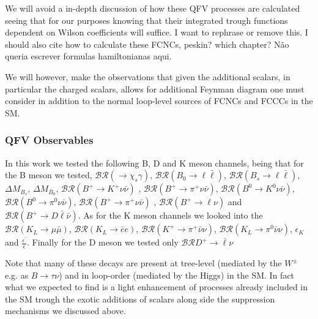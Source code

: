 We will avoid a in-depth discussion of how these QFV processes are calculated seeing that for our purposes knowing that their integrated trough functions dependent on Wilson coefficients will suffice. {\color{red} I want to rephrase or remove this. I should also cite how to calculate these FCNCs, peskin? which chapter? Não queria escrever formulas hamiltonianas aqui. } 

We will however, make the observations that given the additional scalars, in particular the charged scalars, allows for additional Feynman diagram one must consider in addition to the normal loop-level sources of FCNCs and FCCCs in the SM. 
% 
%

\subsubsection{QFV Observables}

In this work we tested the following B, D and K meson channels, being that for the B meson we tested, 
$\mathcal{BR} \left( \rightarrow \chi_s \gamma \right)$, 
$\mathcal{BR} \left( B_0 \rightarrow \ell \bar{\ell} \right)$, 
$\mathcal{BR} \left( B_s \rightarrow \ell \bar{\ell} \right)$, 
$\Delta M_{B_s}$, 
$\Delta M_{B_0}$, 
$\mathcal{BR} \left( B^+ \rightarrow K^+\nu\bar{\nu} \right)$ , 
$\mathcal{BR} \left( B^+ \rightarrow \pi^+\nu\bar{\nu} \right)$, 
$\mathcal{BR} \left( B^0 \rightarrow K^0\nu\bar{\nu} \right)$,  
$\mathcal{BR} \left( B^0 \rightarrow \pi^0 \nu\bar{\nu} \right)$, 
$\mathcal{BR} \left( B^+ \rightarrow \pi^+\nu\bar{\nu} \right)$ , 
$\mathcal{BR} \left( B^+ \rightarrow \ell \nu \right)$ and
$\mathcal{BR} \left( B^+ \rightarrow D \bar{\ell} \bar{\nu} \right)$. 
%
As for the K meson channels we looked into the $\mathcal{BR} \left( K_L \rightarrow \mu \bar{\mu} \right)$,  $\mathcal{BR} \left( K_L \rightarrow \bar{e} e \right)$,  $\mathcal{BR} \left( K^+ \rightarrow \pi^+ \bar{\nu} \nu \right)$, $\mathcal{BR} \left( K_L \rightarrow \pi^0 \bar{\nu} \nu \right)$, $\epsilon_K$ and $\frac{\epsilon^\prime}{\epsilon}$. 
%
Finally for the D meson we tested only $\mathcal{BR} D^+ \rightarrow \bar{\ell} \nu$

Note that many of these decays are present at tree-level (mediated by the $W^\pm$ e.g. as $B \rightarrow \tau \nu$) and in loop-order (mediated by the Higgs) in the SM. 
%
In fact what we expected to find is a light enhancement of processes already included in the SM trough the exotic additions of scalars along side the suppression mechanisms we discussed above. 

